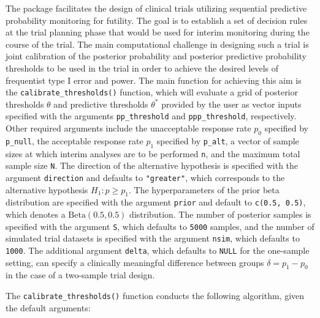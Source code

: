 The  package facilitates the design of clinical trials
utilizing sequential predictive probability monitoring for futility. The
goal is to establish a set of decision rules at the trial planning phase
that would be used for interim monitoring during the course of the
trial. The main computational challenge in designing such a trial is
joint calibration of the posterior probability and posterior predictive
probability thresholds to be used in the trial in order to achieve the
desired levels of frequentist type I error and power. The main function
for achieving this aim is the \texttt{calibrate\_thresholds()} function,
which will evaluate a grid of posterior thresholds \(\theta\) and
predictive thresholds \(\theta^*\) provided by the user as vector inputs
specified with the arguments \texttt{pp\_threshold} and
\texttt{ppp\_threshold}, respectively. Other required arguments include
the unacceptable response rate \(p_0\) specified by \texttt{p\_null},
the acceptable response rate \(p_1\) specified by \texttt{p\_alt}, a
vector of sample sizes at which interim analyses are to be performed
\texttt{n}, and the maximum total sample size \texttt{N}. The direction
of the alternative hypothesis is specified with the argument
\texttt{direction} and defaults to \texttt{"greater"}, which corresponds
to the alternative hypothesis \(H_1: p \geq p_1\). The hyperparameters
of the prior beta distribution are specified with the argument
\texttt{prior} and default to \texttt{c(0.5,\ 0.5)}, which denotes a
\(\mbox{Beta}(0.5, 0.5)\) distribution. The number of posterior samples
is specified with the argument \texttt{S}, which defaults to
\texttt{5000} samples, and the number of simulated trial datasets is
specified with the argument \texttt{nsim}, which defaults to
\texttt{1000}. The additional argument \texttt{delta}, which defaults to
\texttt{NULL} for the one-sample setting, can specify a clinically
meaningful difference between groups \(\delta = p_1 - p_0\) in the case
of a two-sample trial design.

The \texttt{calibrate\_thresholds()} function conducts the following
algorithm, given the default arguments:

